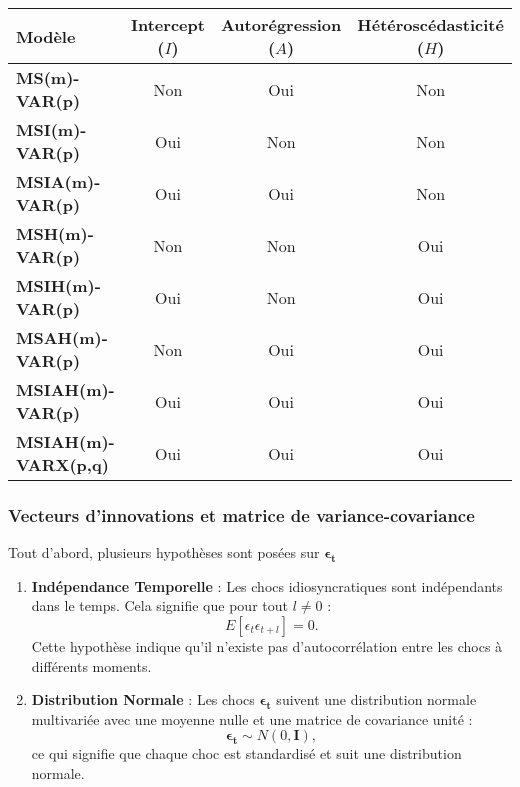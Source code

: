 \begin{sloppypar}
\begin{table}[H]
\centering
\sffamily
\begin{tabular}{@{}lccc@{}}
\toprule
\textbf{Modèle} & \textbf{Intercept ($I$)} & \textbf{Autorégression ($A$)} & \textbf{Hétéroscédasticité ($H$)} \\ \midrule
\textbf{MS(m)-VAR(p)}          & Non                & Oui                 & Non                      \\
\textbf{MSI(m)-VAR(p)}         & Oui                & Non                 & Non                      \\
\textbf{MSIA(m)-VAR(p)}        & Oui                & Oui                 & Non                      \\
\textbf{MSH(m)-VAR(p)}        & Non                & Non                 & Oui                      \\
\textbf{MSIH(m)-VAR(p)}        & Oui                & Non                 & Oui                      \\
\textbf{MSAH(m)-VAR(p)}        & Non                & Oui                 & Oui                      \\
\textbf{MSIAH(m)-VAR(p)}       & Oui                & Oui                 & Oui                      \\
\textbf{MSIAH(m)-VARX(p,q)}    & Oui                & Oui                 & Oui                      \\ \bottomrule
\end{tabular}
\end{table}

\subsubsection{Vecteurs d'innovations et matrice de variance-covariance}

Tout d'abord, plusieurs hypothèses sont posées sur $\bm{\epsilon_t}$
\begin{enumerate}
    \item \textbf{Indépendance Temporelle} : Les chocs idiosyncratiques sont indépendants dans le temps. Cela signifie que pour tout $l \neq 0$ :
    \begin{equation}
        E[\epsilon_t \epsilon_{t+l}] = 0.
    \end{equation}
    Cette hypothèse indique qu'il n'existe pas d'autocorrélation entre les chocs à différents moments.

    \item \textbf{Distribution Normale} : Les chocs $\bm{\epsilon_t}$ suivent une distribution normale multivariée avec une moyenne nulle et une matrice de covariance unité :
    \begin{equation}
        \bm{\epsilon_t} \sim N(0, \bm{I}),
    \end{equation}
    ce qui signifie que chaque choc est standardisé et suit une distribution normale.


\end{enumerate}
\end{sloppypar}
